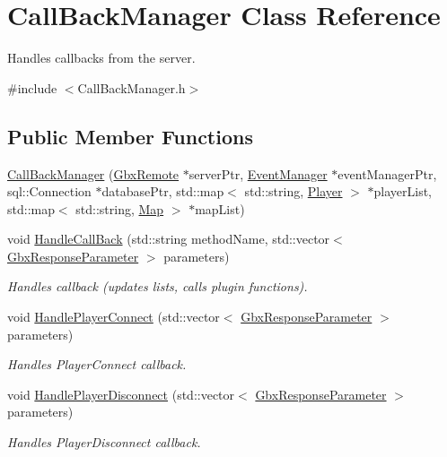 \hypertarget{classCallBackManager}{\section{Call\-Back\-Manager Class Reference}
\label{classCallBackManager}
}


Handles callbacks from the server.  




{\ttfamily \#include $<$Call\-Back\-Manager.\-h$>$}

\subsection*{Public Member Functions}
\begin{DoxyCompactItemize}
\item 
\hyperlink{classCallBackManager_a7c214dd661d44162a6bcddc900af6402}{Call\-Back\-Manager} (\hyperlink{classGbxRemote}{Gbx\-Remote} $\ast$server\-Ptr, \hyperlink{classEventManager}{Event\-Manager} $\ast$event\-Manager\-Ptr, sql\-::\-Connection $\ast$database\-Ptr, std\-::map$<$ std\-::string, \hyperlink{structPlayer}{Player} $>$ $\ast$player\-List, std\-::map$<$ std\-::string, \hyperlink{structMap}{Map} $>$ $\ast$map\-List)
\item 
void \hyperlink{classCallBackManager_a8af5305f668aae4c563e7039b99015c2}{Handle\-Call\-Back} (std\-::string method\-Name, std\-::vector$<$ \hyperlink{classGbxResponseParameter}{Gbx\-Response\-Parameter} $>$ parameters)
\begin{DoxyCompactList}\small\item\em Handles callback (updates lists, calls plugin functions). \end{DoxyCompactList}\item 
void \hyperlink{classCallBackManager_a48e888c80841cf757ebdd69726a8aed5}{Handle\-Player\-Connect} (std\-::vector$<$ \hyperlink{classGbxResponseParameter}{Gbx\-Response\-Parameter} $>$ parameters)
\begin{DoxyCompactList}\small\item\em Handles Player\-Connect callback. \end{DoxyCompactList}\item 
void \hyperlink{classCallBackManager_aa762cbece4e59d8395f5dbd857c53f17}{Handle\-Player\-Disconnect} (std\-::vector$<$ \hyperlink{classGbxResponseParameter}{Gbx\-Response\-Parameter} $>$ parameters)
\begin{DoxyCompactList}\small\item\em Handles Player\-Disconnect callback. \end{DoxyCompactList}\item 

\end{DoxyCompactItemize}
